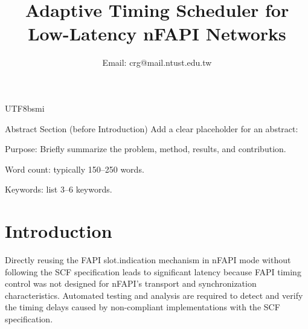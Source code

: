 \documentclass[conference]{IEEEtran}
\begin{document}
\begin{CJK}{UTF8}{bsmi}
\title{Adaptive Timing Scheduler for Low-Latency nFAPI Networks}
\author{
\author{
  Email: crg@mail.ntust.edu.tw
}

}

\maketitle

Abstract Section (before Introduction)
Add a clear placeholder for an abstract:

Purpose: Briefly summarize the problem, method, results, and contribution.

Word count: typically 150–250 words.

Keywords: list 3–6 keywords.

\section{Introduction}
{\color{blue}
Directly reusing the FAPI slot.indication mechanism in nFAPI mode without following the SCF specification leads to significant latency because FAPI timing control was not designed for nFAPI’s transport and synchronization characteristics. Automated testing and analysis are required to detect and verify the timing delays caused by non-compliant implementations with the SCF specification.

}
\end{CJK}
\end{document}
